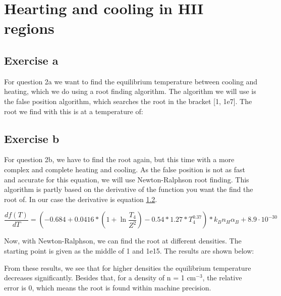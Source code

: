 \section{Hearting and cooling in HII regions}

\subsection{Exercise a}

For question 2a we want to find the equilibrium temperature between cooling and heating, which we do using a root finding algorithm. The algorithm we will use is the false position algorithm, which searches the root in the bracket [1, 1e7]. The root we find with this is at a temperature of:



\subsection{Exercise b}

For question 2b, we have to find the root again, but this time with a more complex and complete heating and cooling. As the false position is not as fast and accurate for this equation, we will use Newton-Ralphson root finding. This algorithm is partly based on the derivative of the function you want the find the root of. In our case the derivative is equation \ref{}.

\begin{equation}
    \frac{df(T)}{dT} = (-0.684 + 0.0416 * (1 + \ln{\frac{T_4}{Z^2}} ) - 0.54 * 1.27 * T_4^{0.37}) * k_B n_H \alpha_B + 8.9\cdot10^{-30}
\end{equation}

Now, with Newton-Ralphson, we can find the root at different densities. The starting point is given as the middle of 1 and 1e15. The results are shown below:



From these results, we see that for higher densities the equilibrium temperature decreases significantly. Besides that, for a density of n = 1 $\mathrm{cm^{-3}}$, the relative error is 0, which means the root is found within machine precision. 

